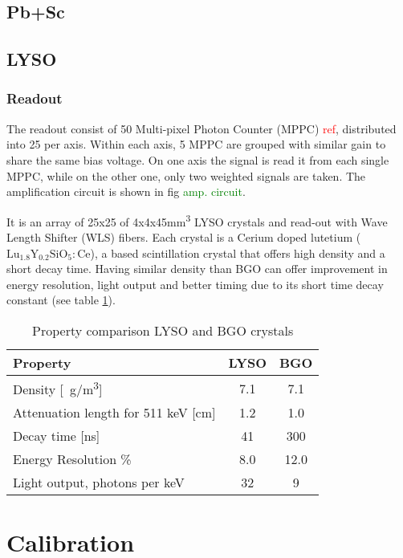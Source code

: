 \subsection{Pb+Sc}
\subsection{LYSO}



\subsubsection{Readout}

The readout consist of 50 Multi-pixel Photon Counter (MPPC) \textcolor{red}{ref}, distributed into 25 per axis. Within
each axis, 5 MPPC are grouped with similar gain to share the same bias voltage. On one axis the signal is read it from
each single MPPC, while on the other one, only two weighted signals are taken. The amplification circuit is shown in fig
\textcolor{green}{amp. circuit}. 


It is an array of 25x25 of 4x4x45\si{\cubic\milli\metre} LYSO crystals and
read-out with Wave Length Shifter (WLS) fibers. Each crystal is a Cerium doped lutetium
($\mathrm{Lu_{1.8}Y_{0.2}SiO_5:Ce}$), a
based scintillation crystal that offers high density and a short decay time. Having similar density than BGO can offer
improvement in energy resolution, light output and better timing due to its short time decay constant (see
table \ref{property}).

\begin{table}[h]\footnotesize
\centering
\begin{tabular*}{0.6\textwidth}{lcc}
Property & LYSO & BGO\\
\hline Density [\SI{}{g/m^3}]& 7.1 & 7.1 \\
Attenuation length for 511 keV [cm] & 1.2 & 1.0\\
Decay time [ns] & 41 & 300\\
Energy Resolution \% & 8.0 & 12.0\\
Light output, photons per keV & 32 &9 \\
\end{tabular*}
\caption{Property comparison LYSO and BGO crystals}\label{property}
\end{table}

\section{Calibration}

